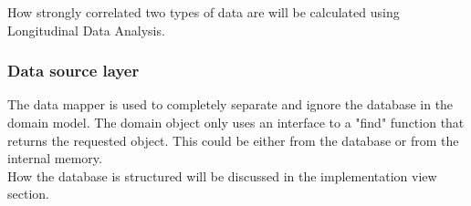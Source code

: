 How strongly correlated two types of data are will be calculated using Longitudinal Data Analysis.

\subsubsection*{Data source layer}
The data mapper \cite{Fowler:2002:PEA:579257} is used to completely separate and ignore the database in the domain model. The domain object only uses an interface to a "find" function that returns the requested object. This could be either from the database or from the internal memory.\\
How the database is structured will be discussed in the implementation view section.





%
%

